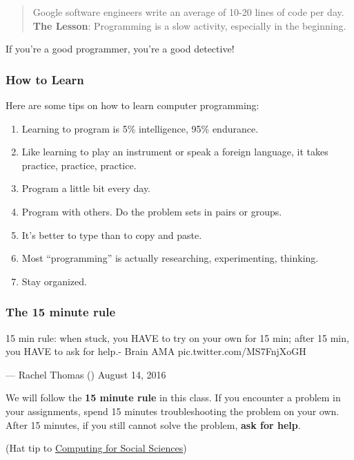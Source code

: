 \documentclass[]{book}
\begin{document}
\begin{quote}
Google software engineers write an average of 10-20 lines of code per
day. \textbf{The Lesson}: Programming is a slow activity, especially in
the beginning.
\end{quote}

If you're a good programmer, you're a good detective!

\subsubsection*{How to Learn}\label{how-to-learn}

Here are some tips on how to learn computer programming:

\begin{enumerate}
\def\labelenumi{\arabic{enumi}.}
\item
  Learning to program is 5\% intelligence, 95\% endurance.
\item
  Like learning to play an instrument or speak a foreign language, it
  takes practice, practice, practice.
\item
  Program a little bit every day.
\item
  Program with others. Do the problem sets in pairs or groups.
\item
  It's better to type than to copy and paste.
\item
  Most ``programming'' is actually researching, experimenting, thinking.
\item
  Stay organized.
\end{enumerate}

\subsubsection*{The 15 minute rule}\label{the-15-minute-rule}

15 min rule: when stuck, you HAVE to try on your own for 15 min; after
15 min, you HAVE to ask for help.- Brain AMA pic.twitter.com/MS7FnjXoGH

--- Rachel Thomas (\citet{math_rachel}) August 14, 2016

We will follow the \textbf{15 minute rule} in this class. If you
encounter a problem in your assignments, spend 15 minutes
troubleshooting the problem on your own. After 15 minutes, if you still
cannot solve the problem, \textbf{ask for help}.

(Hat tip to
\href{https://cfss.uchicago.edu/faq/asking-questions/}{Computing for
Social Sciences})
\end{document}
